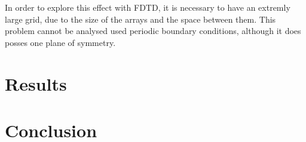 \documentclass[11pt, conference, draftcls, letterpaper]{IEEEtran}
\begin{document}
In order to explore this effect with FDTD, it is necessary to have
an extremly large grid, due to the size of the arrays and the space
between them. This problem cannot be analysed used periodic boundary
conditions, although it does posses one plane of symmetry. 

\section{Results}

\section{Conclusion}




%
\end{document}
